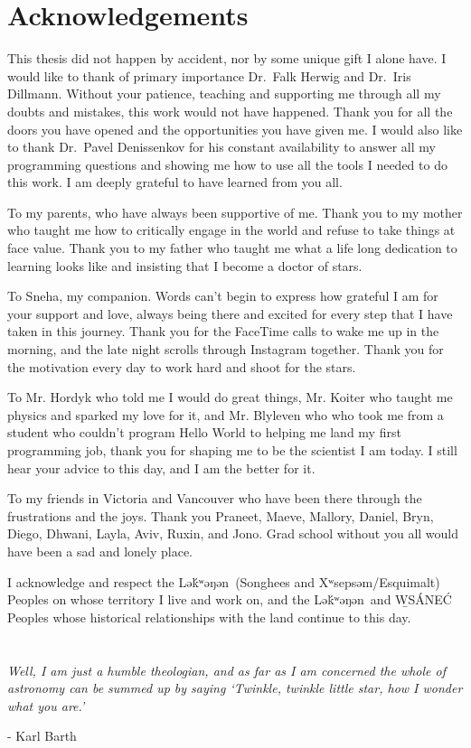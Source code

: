 \newpage
{}

\section*{\large Acknowledgements}
\noindent This thesis did not happen by accident, nor by some unique gift I alone have.
I would like to thank of primary importance Dr.\ Falk Herwig and Dr.\ Iris Dillmann.
Without your patience, teaching and supporting me through all my doubts and mistakes, this work would not have happened.
Thank you for all the doors you have opened and the opportunities you have given me.
I would also like to thank Dr.\ Pavel Denissenkov for his constant availability to answer all my programming questions and showing me how to use all the tools I needed to do this work.
I am deeply grateful to have learned from you all.

To my parents, who have always been supportive of me. 
Thank you to my mother who taught me how to critically engage in the world and refuse to take things at face value.
Thank you to my father who taught me what a life long dedication to learning looks like and insisting that I become a doctor of stars.

To Sneha, my companion. Words can't begin to express how grateful I am for your support and love, always being there and excited for every step that I have taken in this journey.
Thank you for the FaceTime calls to wake me up in the morning, and the late night scrolls through Instagram together.
Thank you for the motivation every day to work hard and shoot for the stars.

To Mr. Hordyk who told me I would do great things, Mr. Koiter who taught me physics and sparked my love for it, and Mr. Blyleven who who took me from a student who couldn't program Hello World to helping me land my first programming job, thank you for shaping me to be the scientist I am today.
I still hear your advice to this day, and I am the better for it.

To my friends in Victoria and Vancouver who have been there through the frustrations and the joys.
Thank you Praneet, Maeve, Mallory, Daniel, Bryn, Diego, Dhwani, Layla, Aviv, Ruxin, and Jono. 
Grad school without you all would have been a sad and lonely place.

I acknowledge and respect the Lə\'{k}ʷəŋən\ (Songhees and Xʷsepsəm/Esquimalt) Peoples on whose territory I live and work on, and the Lə\'{k}ʷəŋən\ and \b{W}SÁNE\'C Peoples whose historical relationships with the land continue to this day.
\\\\\\
\textit{Well, I am just a humble theologian, and as far as I am concerned the whole of astronomy can be summed up by saying `Twinkle, twinkle little star, how I wonder what you are.'}
\begin{flushright}
- Karl Barth
\end{flushright}
